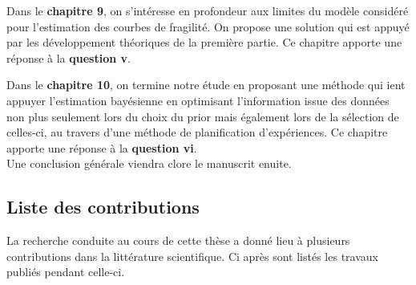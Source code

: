 \noindent
Dans le \textbf{chapitre 9}, on s'intéresse en profondeur aux limites du modèle considéré pour l'estimation des courbes de fragilité. On propose une solution qui est appuyé par les développement théoriques de la première partie. Ce chapitre apporte une réponse à la \textbf{question v}.

\noindent
Dans le \textbf{chapitre 10}, on termine notre étude en proposant une méthode qui ient appuyer l'estimation bayésienne en optimisant l'information issue des données non plus seulement  lors du choix du prior mais également lors de la sélection de celles-ci, au travers d'une méthode de planification d'expériences. Ce chapitre apporte une réponse à la \textbf{question vi}.\\


Une conclusion générale viendra clore le manuscrit enuite.


\subsection{Liste des contributions}

La recherche conduite au cours de cette thèse a donné lieu à plusieurs contributions dans la littérature scientifique. Ci après sont listés les travaux publiés pendant celle-ci.

\nocite{van_biesbroeck_design_2024,van_biesbroeck_generalized_2024,van_biesbroeck_influence_2023,van_biesbroeck_properly_2024,van_biesbroeck_reference_2024,baillie_variational_2025}

